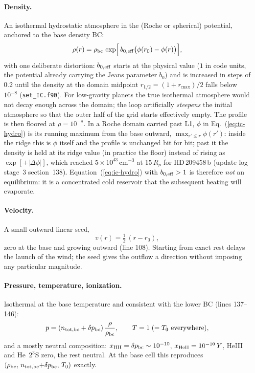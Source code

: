 \documentclass[english,a4paper]{my_memo}
\begin{document}
\paragraph{Density.}
An isothermal hydrostatic atmosphere in the (Roche or spherical)
potential, anchored to the base density BC:
\begin{equation}
\rho(r) = \rho_{\rm bc}\,
   \exp\!\Big[\, b_{0,\rm eff}\big(\phi(r_0) - \phi(r)\big) \Big],
\label{eq:ic-hydro}
\end{equation}
with one deliberate distortion: $b_{0,\rm eff}$ starts at the physical
value ($1$ in code units, the potential already carrying the Jeans
parameter $b_0$) and is increased in steps of $0.2$ until the density
at the domain midpoint $r_{1/2} = (1 + r_{\max})/2$ falls below
$10^{-8}$ (\texttt{set\_IC.f90}). For low-gravity
planets the true isothermal atmosphere would not decay enough across
the domain; the loop artificially \emph{steepens} the initial
atmosphere so that the outer half of the grid starts effectively
empty. The profile is then floored at $\rho = 10^{-8}$. In a Roche domain
carried past L1, $\phi$ in Eq.~(\ref{eq:ic-hydro}) is its running maximum
from the base outward, $\max_{r'\le r}\phi(r')$: inside the ridge this is
$\phi$ itself and the profile is unchanged bit for bit; past it the density
is held at its ridge value (in practice the floor) instead of rising as
$\exp[+|\Delta\phi|]$, which reached $5\times10^{43}$\,cm$^{-3}$ at
$15\,R_p$ for HD\,209458\,b (update log stage~3 section~138).
Equation~(\ref{eq:ic-hydro}) with $b_{0,\rm eff} > 1$ is therefore
\emph{not} an equilibrium: it is a concentrated cold reservoir that
the subsequent heating will evaporate.

\paragraph{Velocity.}
A small outward linear seed,
\begin{equation}
v(r) = \tfrac12\,(r - r_0),
\end{equation}
zero at the base and growing outward (line 108). Starting from exact
rest delays the launch of the wind; the seed gives the outflow a
direction without imposing any particular magnitude.

\paragraph{Pressure, temperature, ionization.}
Isothermal at the base temperature and consistent with the lower BC
(lines 137--146):
\begin{equation}
p = (n_{\rm tot,bc} + \delta p_{\rm bc})\,\frac{\rho}{\rho_{\rm bc}}, \qquad
T = 1 \;(= T_0\ \mbox{everywhere}),
\end{equation}
and a mostly neutral composition: $x_{\rm HII} = \delta p_{\rm bc}
\sim 10^{-10}$, $x_{\rm HeII} = 10^{-10}\,Y$, HeIII and He~$2^3$S
zero, the rest neutral. At the base cell this reproduces
$(\rho_{\rm bc},\, n_{\rm tot,bc}{+}\delta p_{\rm bc},\, T_0)$ exactly.
\end{document}
